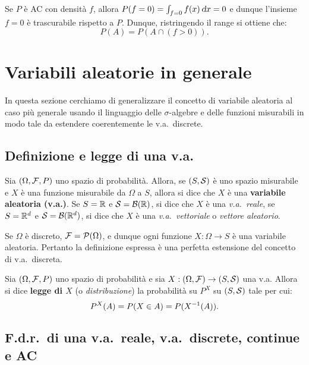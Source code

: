 \begin{multicols*}{2}
\begin{remark}
    Se $P$ è AC con densità $f$, allora $P(f = 0) = \int_{f = 0} f(x) \dx = 0$ e dunque
    l'insieme $f = 0$ è trascurabile rispetto a $P$. Dunque, ristringendo il range si
    ottiene che:
    \[
        P(A) = P(A \cap (f > 0)).
    \]
\end{remark}

\section{Variabili aleatorie in generale}

In questa sezione cerchiamo di generalizzare il concetto di variabile aleatoria
al caso più generale usando il linguaggio delle $\sigma$-algebre e delle
funzioni misurabili in modo tale da estendere coerentemente le v.a.~discrete.

\subsection{Definizione e legge di una v.a.}

\begin{definition}
    Sia $(\Omega, \mathcal{F}, P)$ uno spazio di probabilità. Allora, se
    $(S, \mathcal{S})$ è uno spazio misurabile e $X$ è una funzione misurabile
    da $\Omega$ a $S$, allora si dice che $X$ è una \textbf{variabile aleatoria (v.a.)}.
    Se $S = \mathbb{R}$ e $\mathcal{S} = \mathcal{B}(\mathbb{R})$, si dice che $X$ è una \textit{v.a.~reale},
    se $S = \mathbb{R}^d$ e $\mathcal{S} = \mathcal{B}(\mathbb{R}^d)$, si dice che $X$ è una \textit{v.a.~vettoriale}
    o \textit{vettore aleatorio}.
\end{definition}

\begin{remark}
    Se $\Omega$ è discreto, $\mathcal{F} = \mathcal{P}(\Omega)$, e dunque ogni funzione
    $X : \Omega \to S$ è una variabile aleatoria. Pertanto la definizione
    espressa è una perfetta estensione del concetto di v.a.~discreta.
\end{remark}

\begin{definition}[Legge di $X$]
    Sia $(\Omega, \mathcal{F}, P)$ uno spazio di probabilità e sia
    $X : (\Omega, \mathcal{F}) \to (S, \mathcal{S})$ una v.a. Allora si dice
    \textbf{legge di $X$} (o \textit{distribuzione}) la probabilità
    su $P^X$ su $(S, \mathcal{S})$ tale per cui:
    \[
        P^X(A) = P(X \in A) = P(X^{-1}(A)).
    \]
\end{definition}

\subsection{F.d.r.~di una v.a.~reale, v.a.~discrete, continue e AC}


\end{multicols*}
